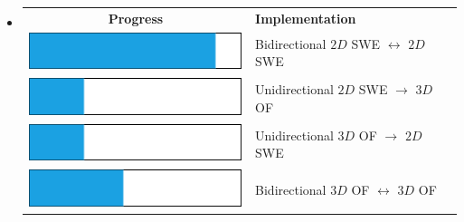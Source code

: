 

\begin{frame}
\begin{multicols}{2}
\begin{itemize}
\item<1->[]
{\renewcommand{\arraystretch}{2.5} %
\begin{table}[]
\begin{tabular}{ cl }
{\large\textbf{Progress}} & {\large\hspace{5pt} \textbf{Implementation}}\\
\includegraphics[scale=0.5]{./Resources/Images/bar1.png} & \hspace{5pt}Bidirectional $2D$ SWE $\leftrightarrow$ $2D$ SWE  \\ 
\includegraphics[scale=0.5]{./Resources/Images/bar2.png} &\hspace{5pt} Unidirectional $2D$ SWE $\rightarrow$ $3D$ OF \\ 
\includegraphics[scale=0.5]{./Resources/Images/bar2.png} &\hspace{5pt} Unidirectional $3D$ OF $\rightarrow$ $2D$ SWE \\ 
\includegraphics[scale=0.5]{./Resources/Images/bar3.png} & \hspace{5pt} Bidirectional $3D$ OF $\leftrightarrow$ $3D$ OF \\
\end{tabular}

\end{table}
}

\vfill\columnbreak


\end{itemize}
\end{multicols}
\end{frame}
